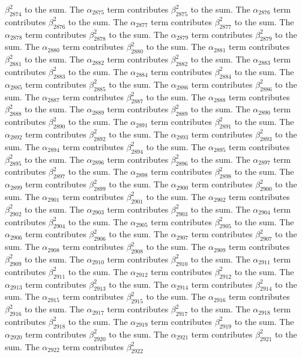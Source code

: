 \begin{lemma}
$\beta_{2874}^{2}$ to the sum. The $\alpha_{2875}$ term contributes $\beta_{2875}^{2}$ to the sum. The $\alpha_{2876}$ term contributes $\beta_{2876}^{2}$ to the sum. The $\alpha_{2877}$ term contributes $\beta_{2877}^{2}$ to the sum. The $\alpha_{2878}$ term contributes $\beta_{2878}^{2}$ to the sum. The $\alpha_{2879}$ term contributes $\beta_{2879}^{2}$ to the sum. The $\alpha_{2880}$ term contributes $\beta_{2880}^{2}$ to the sum. The $\alpha_{2881}$ term contributes $\beta_{2881}^{2}$ to the sum. The $\alpha_{2882}$ term contributes $\beta_{2882}^{2}$ to the sum. The $\alpha_{2883}$ term contributes $\beta_{2883}^{2}$ to the sum. The $\alpha_{2884}$ term contributes $\beta_{2884}^{2}$ to the sum. The $\alpha_{2885}$ term contributes $\beta_{2885}^{2}$ to the sum. The $\alpha_{2886}$ term contributes $\beta_{2886}^{2}$ to the sum. The $\alpha_{2887}$ term contributes $\beta_{2887}^{2}$ to the sum. The $\alpha_{2888}$ term contributes $\beta_{2888}^{2}$ to the sum. The $\alpha_{2889}$ term contributes $\beta_{2889}^{2}$ to the sum. The $\alpha_{2890}$ term contributes $\beta_{2890}^{2}$ to the sum. The $\alpha_{2891}$ term contributes $\beta_{2891}^{2}$ to the sum. The $\alpha_{2892}$ term contributes $\beta_{2892}^{2}$ to the sum. The $\alpha_{2893}$ term contributes $\beta_{2893}^{2}$ to the sum. The $\alpha_{2894}$ term contributes $\beta_{2894}^{2}$ to the sum. The $\alpha_{2895}$ term contributes $\beta_{2895}^{2}$ to the sum. The $\alpha_{2896}$ term contributes $\beta_{2896}^{2}$ to the sum. The $\alpha_{2897}$ term contributes $\beta_{2897}^{2}$ to the sum. The $\alpha_{2898}$ term contributes $\beta_{2898}^{2}$ to the sum. The $\alpha_{2899}$ term contributes $\beta_{2899}^{2}$ to the sum. The $\alpha_{2900}$ term contributes $\beta_{2900}^{2}$ to the sum. The $\alpha_{2901}$ term contributes $\beta_{2901}^{2}$ to the sum. The $\alpha_{2902}$ term contributes $\beta_{2902}^{2}$ to the sum. The $\alpha_{2903}$ term contributes $\beta_{2903}^{2}$ to the sum. The $\alpha_{2904}$ term contributes $\beta_{2904}^{2}$ to the sum. The $\alpha_{2905}$ term contributes $\beta_{2905}^{2}$ to the sum. The $\alpha_{2906}$ term contributes $\beta_{2906}^{2}$ to the sum. The $\alpha_{2907}$ term contributes $\beta_{2907}^{2}$ to the sum. The $\alpha_{2908}$ term contributes $\beta_{2908}^{2}$ to the sum. The $\alpha_{2909}$ term contributes $\beta_{2909}^{2}$ to the sum. The $\alpha_{2910}$ term contributes $\beta_{2910}^{2}$ to the sum. The $\alpha_{2911}$ term contributes $\beta_{2911}^{2}$ to the sum. The $\alpha_{2912}$ term contributes $\beta_{2912}^{2}$ to the sum. The $\alpha_{2913}$ term contributes $\beta_{2913}^{2}$ to the sum. The $\alpha_{2914}$ term contributes $\beta_{2914}^{2}$ to the sum. The $\alpha_{2915}$ term contributes $\beta_{2915}^{2}$ to the sum. The $\alpha_{2916}$ term contributes $\beta_{2916}^{2}$ to the sum. The $\alpha_{2917}$ term contributes $\beta_{2917}^{2}$ to the sum. The $\alpha_{2918}$ term contributes $\beta_{2918}^{2}$ to the sum. The $\alpha_{2919}$ term contributes $\beta_{2919}^{2}$ to the sum. The $\alpha_{2920}$ term contributes $\beta_{2920}^{2}$ to the sum. The $\alpha_{2921}$ term contributes $\beta_{2921}^{2}$ to the sum. The $\alpha_{2922}$ term contributes $\beta_{2922}^{2}$ 
\end{lemma}
